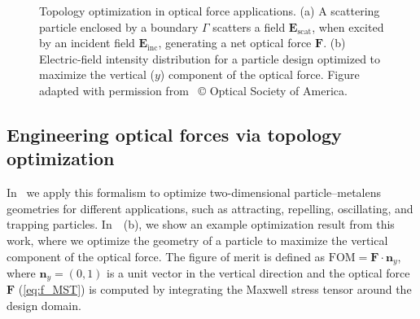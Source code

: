 \begin{figure}[tb]
    \centering
    \caption{Topology optimization in optical force applications. (a) A scattering particle 
    enclosed by a boundary $\Gamma$ scatters a field $\mathbf{E}_\text{scat}$, when excited by an incident field $\mathbf{E}_\text{inc}$, 
    generating a net optical force $\mathbf{F}$. (b) Electric-field intensity distribution for a particle design optimized to maximize the vertical ($y$)
    component of the optical force. Figure adapted with permission from~\cite{ownpub2} © Optical Society of America.}
    \label{fig:eng_res}
\end{figure}

\subsection*{Engineering optical forces via topology optimization}

In~\cite{ownpub2} we apply this formalism to optimize two-dimensional particle--metalens geometries for different applications, such as attracting, repelling, 
oscillating, and trapping particles. In~~(b), we show an example optimization result from this work, where we optimize the geometry of a particle to maximize the vertical component of the optical force. 
The figure of merit is defined as $\text{FOM} = \mathbf{F} \cdot \mathbf{n}_y$, where $\mathbf{n}_y = (0, 1)$ is a unit vector in the vertical direction and 
the optical force $\mathbf{F}$ (\eqref{eq:f_MST}) is computed by integrating the Maxwell stress tensor around the design domain. 

